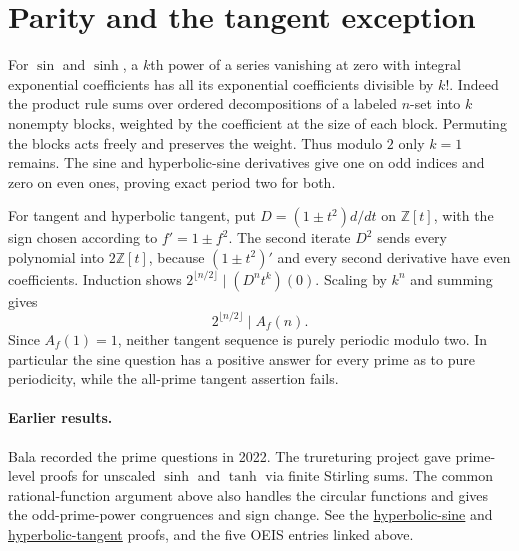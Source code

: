 \documentclass[11pt,letterpaper]{article}
\begin{document}
\section{Parity and the tangent exception}
For $\sin$ and $\sinh$, a $k$th power of a series vanishing at zero with integral exponential coefficients has all its exponential coefficients divisible by $k!$. Indeed the product rule sums over ordered decompositions of a labeled $n$-set into $k$ nonempty blocks, weighted by the coefficient at the size of each block. Permuting the blocks acts freely and preserves the weight. Thus modulo $2$ only $k=1$ remains. The sine and hyperbolic-sine derivatives give one on odd indices and zero on even ones, proving exact period two for both.

For tangent and hyperbolic tangent, put $D=(1\pm t^2)d/dt$ on $\mathbb Z[t]$, with the sign chosen according to $f'=1\pm f^2$. The second iterate $D^2$ sends every polynomial into $2\mathbb Z[t]$, because $(1\pm t^2)'$ and every second derivative have even coefficients. Induction shows $2^{\lfloor n/2\rfloor}\mid (D^n t^k)(0)$. Scaling by $k^n$ and summing gives
\[
                       2^{\lfloor n/2\rfloor}\mid A_f(n).
\]
Since $A_f(1)=1$, neither tangent sequence is purely periodic modulo two. In particular the sine question has a positive answer for every prime as to pure periodicity, while the all-prime tangent assertion fails.

\paragraph{Earlier results.}
Bala recorded the prime questions in 2022. The trureturing project gave prime-level proofs for unscaled $\sinh$ and $\tanh$ via finite Stirling sums. The common rational-function argument above also handles the circular functions and gives the odd-prime-power congruences and sign change. See the \href{https://www.trureturing.org/research/oeis-a224899-sinh-power-prime-period/}{hyperbolic-sine} and \href{https://www.trureturing.org/research/oeis-a221077-tanh-power-prime-period/}{hyperbolic-tangent} proofs, and the five OEIS entries linked above.
\end{document}
